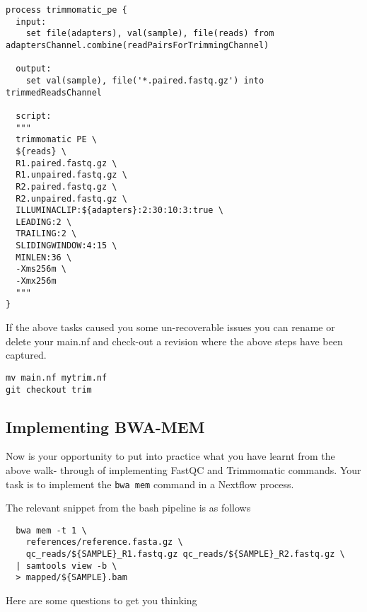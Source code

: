 \begin{lstlisting}
process trimmomatic_pe {
  input:
    set file(adapters), val(sample), file(reads) from adaptersChannel.combine(readPairsForTrimmingChannel)

  output:
    set val(sample), file('*.paired.fastq.gz') into trimmedReadsChannel

  script:
  """
  trimmomatic PE \
  ${reads} \
  R1.paired.fastq.gz \
  R1.unpaired.fastq.gz \
  R2.paired.fastq.gz \
  R2.unpaired.fastq.gz \
  ILLUMINACLIP:${adapters}:2:30:10:3:true \
  LEADING:2 \
  TRAILING:2 \
  SLIDINGWINDOW:4:15 \
  MINLEN:36 \
  -Xms256m \
  -Xmx256m
  """
}
\end{lstlisting}




\begin{note}
If the above tasks caused you some un-recoverable issues you can rename or delete your main.nf and check-out a revision where the above steps have been captured.
\begin{lstlisting}
mv main.nf mytrim.nf
git checkout trim
\end{lstlisting}
\end{note}


\subsection{Implementing BWA-MEM}

Now is your opportunity to put into practice what you have learnt from the above walk-
through of implementing FastQC and Trimmomatic commands. Your task is to implement
the \texttt{bwa mem} command in a Nextflow process.


The relevant snippet from the bash pipeline is as follows 
\begin{lstlisting}
  bwa mem -t 1 \
    references/reference.fasta.gz \
    qc_reads/${SAMPLE}_R1.fastq.gz qc_reads/${SAMPLE}_R2.fastq.gz \
  | samtools view -b \
  > mapped/${SAMPLE}.bam
\end{lstlisting}

Here are some questions to get you thinking 

